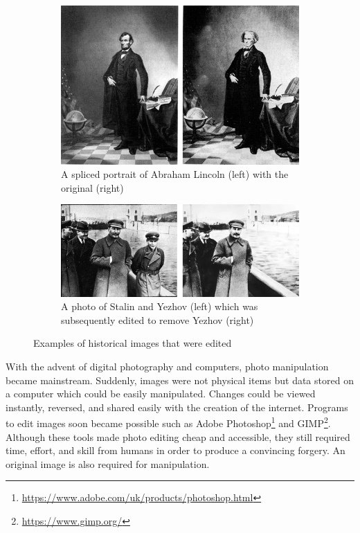 \begin{figure}[H]
    \centering
    \begin{subfigure}{0.45\textwidth}
            \includegraphics[width=\textwidth]{dissertation//figures/lincoln1960.jpg}
            \caption{A spliced portrait of Abraham Lincoln (left) with the original (right)\cite{singh2018art}}
            \label{fig:lincoln}
    \end{subfigure}
    \begin{subfigure}{0.45\textwidth}
        \includegraphics[width=\textwidth]{dissertation//figures/stalin.png}
        \caption{A photo of Stalin and Yezhov (left) which was subsequently edited to remove Yezhov (right)}
        \label{fig:stalin-yezhov}
    \end{subfigure}
    \caption{Examples of historical images that were edited}
    \label{fig:edited-images}
\end{figure}

With the advent of digital photography and computers, photo manipulation became mainstream. Suddenly, images were not physical items but data stored on a computer which could be easily manipulated. Changes could be viewed instantly, reversed, and shared easily with the creation of the internet. Programs to edit images soon became possible such as Adobe Photoshop\footnote{\url{https://www.adobe.com/uk/products/photoshop.html}} and GIMP\footnote{\url{https://www.gimp.org/}}. Although these tools made photo editing cheap and accessible, they still required time, effort, and skill from humans in order to produce a convincing forgery. An original image is also required for manipulation.

